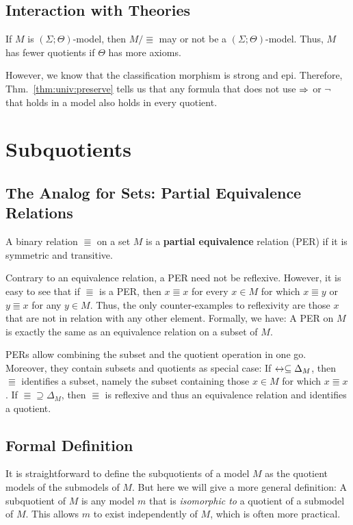 \subsection{Interaction with Theories}

If $M$ is $(\Sigma;\Theta)$-model, then $M/\Equiv$ may or not be a $(\Sigma;\Theta)$-model.
Thus, $M$ has fewer quotients if $\Theta$ has more axioms.

However, we know that the classification morphism is strong and epi.
Therefore, Thm.~\ref{thm:univ:preserve} tells us that any formula that does not use $\Rightarrow$ or $\neg$ that holds in a model also holds in every quotient.

\section{Subquotients}

\subsection{The Analog for Sets: Partial Equivalence Relations}

A binary relation $\Equiv$ on a set $M$ is a \textbf{partial equivalence} relation (PER) if it is symmetric and transitive.

Contrary to an equivalence relation, a PER need not be reflexive.
However, it is easy to see that if $\Equiv$ is a PER, then $x\Equiv x$ for every $x\in M$ for which $x\Equiv y$ or $y\Equiv x$ for any $y\in M$.
Thus, the only counter-examples to reflexivity are those $x$ that are not in relation with any other element.
Formally, we have: A PER on $M$ is exactly the same as an equivalence relation on a subset of $M$.

PERs allow combining the subset and the quotient operation in one go.
Moreover, they contain subsets and quotients as special case:
If $\Equiv\sq \Delta_M$, then $\Equiv$ identifies a subset, namely the subset containing those $x\in M$ for which $x\Equiv x$.
If $\Equiv\supseteq \Delta_M$, then $\Equiv$ is reflexive and thus an equivalence relation and identifies a quotient.

\subsection{Formal Definition}

It is straightforward to define the subquotients of a model $M$ as the quotient models of the submodels of $M$.
But here we will give a more general definition: A subquotient of $M$ is any model $m$ that is \emph{isomorphic to} a quotient of a submodel of $M$.
This allows $m$ to exist independently of $M$, which is often more practical.

